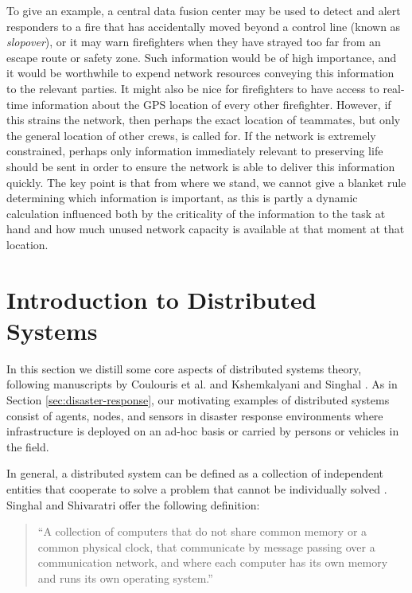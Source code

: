 \documentclass[]             %
{NASA}                       %
\theoremstyle{definition}
\begin{document}
To give an example, a central data fusion center may be used to detect
and alert responders to a fire that has accidentally moved beyond a
control line (known as \emph{slopover}), or it may warn firefighters
when they have strayed too far from an escape route or safety
zone. Such information would be of high importance, and it would be
worthwhile to expend network resources conveying this information to
the relevant parties. It might also be nice for firefighters to have
access to real-time information about the GPS location of every other
firefighter. However, if this strains the network, then perhaps the
exact location of teammates, but only the general location of other
crews, is called for. If the network is extremely constrained, perhaps
only information immediately relevant to preserving life should be
sent in order to ensure the network is able to deliver this
information quickly. The key point is that from where we stand, we
cannot give a blanket rule determining which information is important,
as this is partly a dynamic calculation influenced both by the
criticality of the information to the task at hand and how much unused
network capacity is available at that moment at that location.

\section{Introduction to Distributed Systems}
\label{sec:background}
In this section we distill some core aspects of distributed systems
theory, following manuscripts by Coulouris et al.
\cite{coulouris2005distributed} and Kshemkalyani and Singhal
\cite{kshemkalyani_singhal_2008}. As in Section
\ref{sec:disaster-response}, our motivating examples of distributed
systems consist of agents, nodes, and sensors in disaster response
environments where infrastructure is deployed on an ad-hoc basis or
carried by persons or vehicles in the field.

In general, a distributed system can be defined as a collection of
independent entities that cooperate to solve a problem that cannot be
individually solved \cite{kshemkalyani_singhal_2008}. Singhal and
Shivaratri \cite{10.5555/562065} offer the following definition:
\begin{quote}
  ``A collection of computers that do not share common memory or a common
  physical clock, that communicate by message passing over a communication
  network, and where each computer has its own memory and runs its own
  operating system.''
\end{quote}
\end{document}
